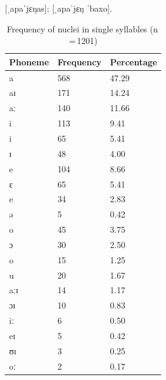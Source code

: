 \pex
	\a {} [ˌapaˈjɛŋas];
	\a {} [ˌapaˈjɛŋ ˈbaxo].
\xe

\begin{table}[pth]\centering
\caption[Frequency of nuclei in single syllables]{Frequency of nuclei in single 
syllables (n\,=\,1201)}
\begin{tabu} to 0.5\linewidth{X X[c] X[c]}
\tableheaderfont\toprule
Phoneme
	& Frequency
	& Percentage
	\\
	
\toprule

a
	& 568
	& 47.29\pct
	\\

aɪ
	& 171
	& 14.24\pct
	\\

aː
	& 140
	& 11.66\pct
	\\

\midrule

i
	& 113
	& 9.41\pct
	\\

\rowfont{\scriptsize\itshape}
\raggedleft
i
	& 65
	& 5.41\pct
	\\

\rowfont{\scriptsize\itshape}
\raggedleft
ɪ
	& 48
	& 4.00\pct
	\\

\midrule

e
	& 104
	& 8.66\pct
	\\

\rowfont{\scriptsize\itshape}
\raggedleft
ɛ
	& 65
	& 5.41\pct
	\\

\rowfont{\scriptsize\itshape}
\raggedleft
e
	& 34
	& 2.83\pct
	\\

\rowfont{\scriptsize\itshape}
\raggedleft
ə
	& 5
	& 0.42\pct
	\\

\midrule

o
	& 45
	& 3.75\pct
	\\

\rowfont{\scriptsize\itshape}
\raggedleft
ɔ
	& 30
	& 2.50\pct
	\\

\rowfont{\scriptsize\itshape}
\raggedleft
o
	& 15
	& 1.25\pct
	\\

\midrule

u
	& 20
	& 1.67\pct
	\\

aːɪ
	& 14
	& 1.17\pct
	\\

ɔɪ
	& 10
	& 0.83\pct
	\\

iː
	& 6
	& 0.50\pct
	\\

eɪ
	& 5
	& 0.42\pct
	\\

ʊɪ
	& 3
	& 0.25\pct
	\\

oː
	& 2
	& 0.17\pct
	\\

\bottomrule
\end{tabu}
\label{tab:singnuc}
\end{table}

